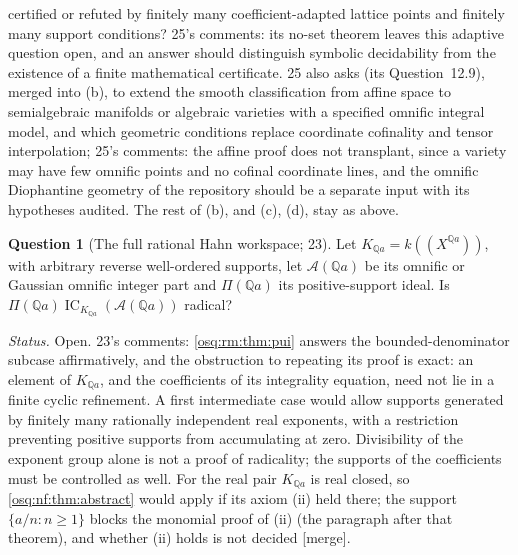 \documentclass[11pt,letterpaper]{article}
\numberwithin{equation}{section}
\theoremstyle{definition}
\newtheorem{question}[question]{Question}
\theoremstyle{remark}
\theoremstyle{plain}
\newcommand{\Q}{\mathbb Q}
\newcommand{\A}{\mathcal A}          %
\newcommand{\hahn}[2]{#1(\!(X^{#2})\!)}
\newcommand{\IC}{\operatorname{IC}}
\newcommand{\merge}{\textup{\textsf{[merge]}}}
\begin{document}
certified or refuted by finitely many coefficient-adapted lattice points and finitely many support conditions? 25's comments: its no-set theorem leaves
this adaptive question open, and an answer should distinguish symbolic decidability from the existence of a finite mathematical certificate. 25 also asks
(its Question~12.9), merged into (b), to extend the smooth classification from affine space to semialgebraic manifolds or algebraic varieties with a
specified omnific integral model, and which geometric conditions replace coordinate cofinality and tensor interpolation; 25's comments: the affine proof
does not transplant, since a variety may have few omnific points and no cofinal coordinate lines, and the omnific Diophantine geometry of the repository
\cite{RepoOdg} should be a separate input with its hypotheses audited. The rest of (b), and (c), (d), stay as above.

\begin{question}[The full rational Hahn workspace; 23]\label{osq:rm:q:fullQ}
Let $K_{\Q a}=\hahn k{\Q a}$, with arbitrary reverse well-ordered supports, let $\A(\Q a)$ be its omnific or Gaussian omnific integer part and
$\Pi(\Q a)$ its positive-support ideal. Is $\Pi(\Q a)\IC_{K_{\Q a}}(\A(\Q a))$ radical?
\end{question}
\emph{Status.} Open. 23's comments: \cref{osq:rm:thm:pui} answers the bounded-denominator subcase affirmatively, and the obstruction to repeating its
proof is exact: an element of $K_{\Q a}$, and the coefficients of its integrality equation, need not lie in a finite cyclic refinement. A first
intermediate case would allow supports generated by finitely many rationally independent real exponents, with a restriction preventing positive
supports from accumulating at zero. Divisibility of the exponent group alone is not a proof of radicality; the supports of the coefficients must be
controlled as well. For the real pair $K_{\Q a}$ is real closed, so \cref{osq:nf:thm:abstract} would apply if its axiom (ii) held there; the support
$\{a/n:n\ge1\}$ blocks the monomial proof of (ii) (the paragraph after that theorem), and whether (ii) holds is not decided \merge.
\end{document}
